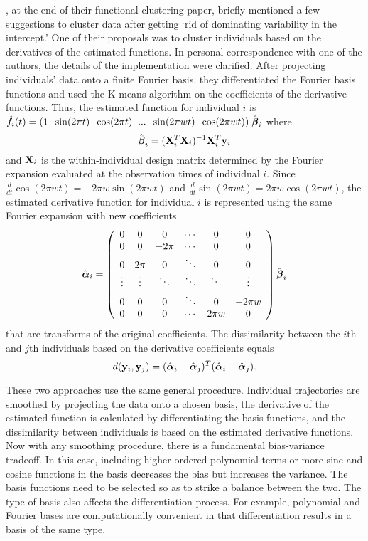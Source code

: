 \Textcite{tarpey2003}, at the end of their functional clustering paper, briefly mentioned a few suggestions to cluster data after getting `rid of dominating variability in the intercept.' One of their proposals was to cluster individuals based on the derivatives of the estimated functions. In personal correspondence with one of the authors, the details of the implementation were clarified. After projecting individuals' data onto a finite Fourier basis, they differentiated the Fourier basis functions and used the K-means algorithm on the coefficients of the derivative functions. Thus, the estimated function for individual $i$ is $\hat{f}_{i}(t)= (1\;\; \sin(2\pi t)\;\;\cos(2\pi t)\;\;...\;\;\sin(2\pi wt)\;\;\cos(2\pi wt))\;\hat{\boldsymbol\beta}_{i}$ where
$$\hat{\boldsymbol\beta}_{i} = (\mathbf X^{T}_{i}\mathbf X_{i})^{-1}\mathbf X^{T}_{i}\mathbf y_{i}$$
and $\mathbf X_{i}$ is the within-individual design matrix determined by the Fourier expansion evaluated at the observation times of individual $i$. Since $\frac{d}{dt}\cos(2\pi wt) = -2\pi w\sin(2\pi wt)$ and $\frac{d}{dt}\sin(2\pi wt) = 2\pi w\cos(2\pi wt)$, the estimated derivative function for individual $i$ is represented using the same Fourier expansion with new coefficients 
$$\hat{\boldsymbol\alpha}_{i} = \left(\begin{array}{cccccc}
0 & 0&0&\cdots&0&0\\
0&0&-2\pi &\cdots&0&0\\
0&2\pi &0&\ddots&0&0\\
\vdots&\vdots&\ddots&\ddots&\ddots&\vdots\\
0&0&0&\ddots&0&-2\pi w\\
0&0&0&\cdots&2\pi w&0\end{array}\right)\hat{\boldsymbol\beta}_{i}$$
that are transforms of the original coefficients. The dissimilarity between the $i$th and $j$th individuals based on the derivative coefficients equals
$$d(\mathbf y_{i},\mathbf y_{j}) = (\hat{\boldsymbol\alpha}_{i}-\hat{\boldsymbol\alpha}_{j})^{T}(\hat{\boldsymbol\alpha}_{i}-\hat{\boldsymbol\alpha}_{j}).$$

These two approaches use the same general procedure. Individual trajectories are smoothed by projecting the data onto a chosen basis, the derivative of the estimated function is calculated by differentiating the basis functions, and the dissimilarity between individuals is based on the estimated derivative functions. Now with any smoothing procedure, there is a fundamental bias-variance tradeoff. In this case, including higher ordered polynomial terms or more sine and cosine functions in the basis decreases the bias but increases the variance. The basis functions need to be selected so as to strike a balance between the two. The type of basis also affects the differentiation process. For example, polynomial and Fourier bases are computationally convenient in that differentiation results in a basis of the same type.

